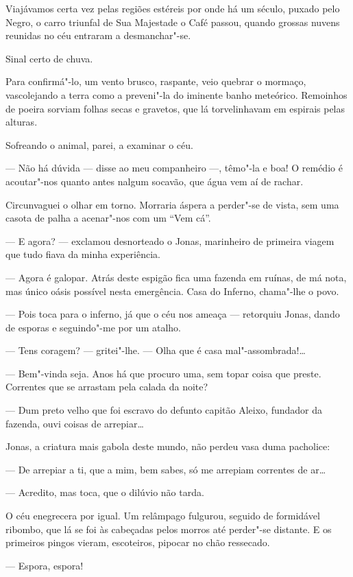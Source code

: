 Viajávamos certa vez pelas regiões estéreis por onde há um século,
puxado pelo Negro, o carro triunfal de Sua Majestade o Café passou,
quando grossas nuvens reunidas no céu entraram a desmanchar"-se.

Sinal certo de chuva.

Para confirmá"-lo, um vento brusco, raspante, veio quebrar o mormaço,
vascolejando a terra como a preveni"-la do iminente banho meteórico.
Remoinhos de poeira sorviam folhas secas e gravetos, que lá
torvelinhavam em espirais pelas alturas.

Sofreando o animal, parei, a examinar o céu.

--- Não há dúvida --- disse ao meu companheiro ---, têmo"-la e boa! O
remédio é acoutar"-nos quanto antes nalgum socavão, que água vem aí de
rachar.

Circunvaguei o olhar em torno. Morraria áspera a perder"-se de vista, sem
uma casota de palha a acenar"-nos com um ``Vem cá''.

--- E agora? --- exclamou desnorteado o Jonas, marinheiro de primeira
viagem que tudo fiava da minha experiência.

--- Agora é galopar. Atrás deste espigão fica uma fazenda em ruínas, de
má nota, mas único oásis possível nesta emergência. Casa do Inferno,
chama"-lhe o povo.

--- Pois toca para o inferno, já que o céu nos ameaça --- retorquiu
Jonas, dando de esporas e seguindo"-me por um atalho.

--- Tens coragem? --- gritei"-lhe. --- Olha que é casa mal"-assombrada!\ldots{}

--- Bem"-vinda seja. Anos há que procuro uma, sem topar coisa que preste.
Correntes que se arrastam pela calada da noite?

--- Dum preto velho que foi escravo do defunto capitão Aleixo, fundador
da fazenda, ouvi coisas de arrepiar\ldots{}

Jonas, a criatura mais gabola deste mundo, não perdeu vasa duma
pacholice:

--- De arrepiar a ti, que a mim, bem sabes, só me arrepiam correntes de
ar\ldots{}

--- Acredito, mas toca, que o dilúvio não tarda.

O céu enegrecera por igual. Um relâmpago fulgurou, seguido de formidável
ribombo, que lá se foi às cabeçadas pelos morros até perder"-se distante.
E os primeiros pingos vieram, escoteiros, pipocar no chão ressecado.

--- Espora, espora!

